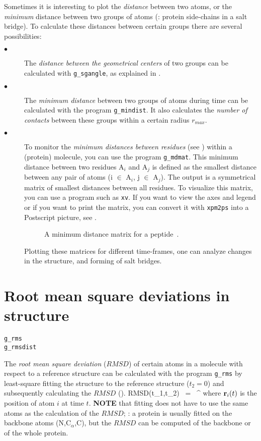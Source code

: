 Sometimes it is interesting to plot the {\em distance} between two atoms,
or the {\em minimum} distance between two groups of atoms
({\eg}: protein side-chains in a salt bridge). 
To calculate these distances between certain groups there are several 
possibilities:
\begin{description}
\item[$\bullet$] 
The {\em distance between the geometrical centers} of two groups can be 
calculated with {\tt g\_sgangle}, as explained in . 
\item[$\bullet$] 
The {\em minimum distance} between two groups of atoms during time 
can be calculated with the program {\tt g\_mindist}. It also calculates the 
{\em number of contacts} between these groups 
within a certain radius $r_{max}$.
\item[$\bullet$] 
To monitor the {\em minimum distances between residues} 
(see ) within a (protein) molecule, you can use 
the program {\tt g\_mdmat}. This minimum distance between two residues
A$_i$ and A$_j$ is defined as the smallest distance between any pair of 
atoms (i $\in$ A$_i$, j $\in$ A$_j$).
The output is a symmetrical matrix of smallest distances 
between all residues.
To visualize this matrix, you can use a program such as {\tt xv}.
If you want to view the axes and legend or if you want to print
the matrix, you can convert it with 
{\tt xpm2ps} into a Postscript picture, see .
\begin{figure}
\centerline{
}
\caption{A minimum distance matrix for a peptide~\protect\cite{Spoel96b}.}
\label{fig:mdmat}
\end{figure}

Plotting these matrices for different time-frames, one can analyze changes 
in the structure, and {\eg} forming of salt bridges.
\end{description}


\section{Root mean square deviations in structure}
\label{sec:rmsd}
\begin{verbatim}
g_rms
g_rmsdist
\end{verbatim}
The {\em root mean square deviation} ($RMSD$) of certain atoms in a molecule
with respect to a reference structure can be calculated with the program 
{\tt g\_rms} by least-square fitting the structure to the reference structure
($t_2 = 0$) and subsequently calculating the $RMSD$ ().
\beq
RMSD(t_1,t_2) ~=~ \left[\frac{1}{N} \sum_{i=1}^N ({\bf r}_i(t_1)-{\bf r}_i(t_2))^2 \right]^{}
\label{eqn:rmsd}
\eeq
where ${\bf r}_i(t)$ is the position of atom $i$ at time $t$.
{\bf NOTE} that fitting does not have to use the same atoms as the calculation
of the $RMSD$; {\eg}: a protein is usually fitted on the backbone atoms
(N,C$_{\alpha}$,C), but the $RMSD$ can be computed of the backbone
or of the whole protein.


